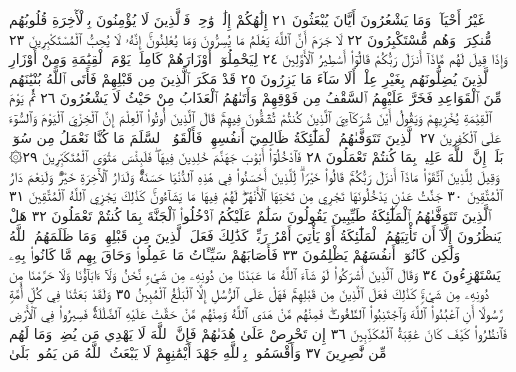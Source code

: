 غَيْرُ أَحْيَآءࣲۖ وَمَا يَشْعُرُونَ أَيَّانَ يُبْعَثُونَ ٢١ إِلَٰهُكُمْ إِلَٰهࣱ
وَٰحِدࣱۚ فَٱلَّذِينَ لَا يُؤْمِنُونَ بِٱلْأٓخِرَةِ قُلُوبُهُم مُّنكِرَةࣱ وَهُم
مُّسْتَكْبِرُونَ ٢٢ لَا جَرَمَ أَنَّ ٱللَّهَ يَعْلَمُ مَا يُسِرُّونَ وَمَا
يُعْلِنُونَۚ إِنَّهُۥ لَا يُحِبُّ ٱلْمُسْتَكْبِرِينَ ٢٣ وَإِذَا قِيلَ لَهُم
مَّاذَآ أَنزَلَ رَبُّكُمْ قَالُوٓا۟ أَسَٰطِيرُ ٱلْأَوَّلِينَ ٢٤ لِيَحْمِلُوٓا۟
أَوْزَارَهُمْ كَامِلَةࣰ يَوْمَ ٱلْقِيَٰمَةِ وَمِنْ أَوْزَارِ ٱلَّذِينَ يُضِلُّونَهُم
بِغَيْرِ عِلْمٍۗ أَلَا سَآءَ مَا يَزِرُونَ ٢٥ قَدْ مَكَرَ ٱلَّذِينَ مِن قَبْلِهِمْ
فَأَتَى ٱللَّهُ بُنْيَٰنَهُم مِّنَ ٱلْقَوَاعِدِ فَخَرَّ عَلَيْهِمُ ٱلسَّقْفُ
مِن فَوْقِهِمْ وَأَتَىٰهُمُ ٱلْعَذَابُ مِنْ حَيْثُ لَا يَشْعُرُونَ ٢٦
ثُمَّ يَوْمَ ٱلْقِيَٰمَةِ يُخْزِيهِمْ وَيَقُولُ أَيْنَ شُرَكَآءِيَ ٱلَّذِينَ
كُنتُمْ تُشَٰٓقُّونَ فِيهِمْۚ قَالَ ٱلَّذِينَ أُوتُوا۟ ٱلْعِلْمَ إِنَّ ٱلْخِزْيَ
ٱلْيَوْمَ وَٱلسُّوٓءَ عَلَى ٱلْكَٰفِرِينَ ٢٧ ٱلَّذِينَ تَتَوَفَّىٰهُمُ ٱلْمَلَٰٓئِكَةُ
ظَالِمِيٓ أَنفُسِهِمْۖ فَأَلْقَوُا۟ ٱلسَّلَمَ مَا كُنَّا نَعْمَلُ مِن سُوٓءِۭۚ بَلَىٰٓۚ
إِنَّ ٱللَّهَ عَلِيمُۢ بِمَا كُنتُمْ تَعْمَلُونَ ٢٨ فَٱدْخُلُوٓا۟ أَبْوَٰبَ جَهَنَّمَ
خَٰلِدِينَ فِيهَاۖ فَلَبِئْسَ مَثْوَى ٱلْمُتَكَبِّرِينَ ٢٩۞ وَقِيلَ
لِلَّذِينَ ٱتَّقَوْا۟ مَاذَآ أَنزَلَ رَبُّكُمْۚ قَالُوا۟ خَيْرࣰاۗ لِّلَّذِينَ أَحْسَنُوا۟ فِي
هَٰذِهِ ٱلدُّنْيَا حَسَنَةࣱۚ وَلَدَارُ ٱلْأٓخِرَةِ خَيْرࣱۚ وَلَنِعْمَ دَارُ ٱلْمُتَّقِينَ ٣٠
جَنَّٰتُ عَدْنࣲ يَدْخُلُونَهَا تَجْرِي مِن تَحْتِهَا ٱلْأَنْهَٰرُۖ
لَهُمْ فِيهَا مَا يَشَآءُونَۚ كَذَٰلِكَ يَجْزِي ٱللَّهُ ٱلْمُتَّقِينَ ٣١
ٱلَّذِينَ تَتَوَفَّىٰهُمُ ٱلْمَلَٰٓئِكَةُ طَيِّبِينَ يَقُولُونَ سَلَٰمٌ عَلَيْكُمُ
ٱدْخُلُوا۟ ٱلْجَنَّةَ بِمَا كُنتُمْ تَعْمَلُونَ ٣٢ هَلْ يَنظُرُونَ إِلَّآ أَن
تَأْتِيَهُمُ ٱلْمَلَٰٓئِكَةُ أَوْ يَأْتِيَ أَمْرُ رَبِّكَۚ كَذَٰلِكَ فَعَلَ ٱلَّذِينَ مِن
قَبْلِهِمْۚ وَمَا ظَلَمَهُمُ ٱللَّهُ وَلَٰكِن كَانُوٓا۟ أَنفُسَهُمْ يَظْلِمُونَ ٣٣
فَأَصَابَهُمْ سَيِّـَٔاتُ مَا عَمِلُوا۟ وَحَاقَ بِهِم مَّا كَانُوا۟ بِهِۦ يَسْتَهْزِءُونَ ٣٤
وَقَالَ ٱلَّذِينَ أَشْرَكُوا۟ لَوْ شَآءَ ٱللَّهُ مَا عَبَدْنَا مِن دُونِهِۦ مِن
شَيْءࣲ نَّحْنُ وَلَآ ءَابَآؤُنَا وَلَا حَرَّمْنَا مِن دُونِهِۦ مِن شَيْءࣲۚ كَذَٰلِكَ
فَعَلَ ٱلَّذِينَ مِن قَبْلِهِمْۚ فَهَلْ عَلَى ٱلرُّسُلِ إِلَّا ٱلْبَلَٰغُ ٱلْمُبِينُ ٣٥
وَلَقَدْ بَعَثْنَا فِي كُلِّ أُمَّةࣲ رَّسُولًا أَنِ ٱعْبُدُوا۟ ٱللَّهَ
وَٱجْتَنِبُوا۟ ٱلطَّٰغُوتَۖ فَمِنْهُم مَّنْ هَدَى ٱللَّهُ وَمِنْهُم مَّنْ
حَقَّتْ عَلَيْهِ ٱلضَّلَٰلَةُۚ فَسِيرُوا۟ فِي ٱلْأَرْضِ فَٱنظُرُوا۟ كَيْفَ
كَانَ عَٰقِبَةُ ٱلْمُكَذِّبِينَ ٣٦ إِن تَحْرِصْ عَلَىٰ هُدَىٰهُمْ
فَإِنَّ ٱللَّهَ لَا يَهْدِي مَن يُضِلُّۖ وَمَا لَهُم مِّن نَّٰصِرِينَ ٣٧
وَأَقْسَمُوا۟ بِٱللَّهِ جَهْدَ أَيْمَٰنِهِمْ لَا يَبْعَثُ ٱللَّهُ مَن يَمُوتُۚ بَلَىٰ
